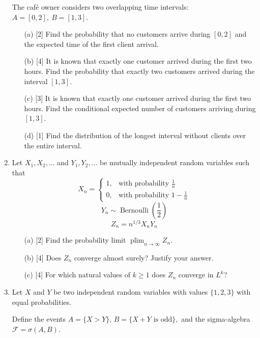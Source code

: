 \begin{enumerate}
The café owner considers two overlapping time intervals:
$
A=[0,2],\ B=[1,3].
$

\begin{enumerate}
    \item[(a)] [2] Find the probability that no customers arrive during \([0,2]\) and the expected time of the first client arrival.

    \item[(b)] [4] It is known that exactly one customer arrived during the first two hours. Find the probability that exactly two customers arrived during the interval \([1,3]\).

    \item[(c)] [3] It is known that exactly one customer arrived during the first two hours. Find the conditional expected number of customers arriving during \([1,3]\).

    \item[(d)] [1] Find the distribution of the longest interval without clients over the entire interval.
\end{enumerate}

\item 
Let $X_1, X_2, \ldots$ and $Y_1, Y_2, \ldots$ be
mutually independent random variables such that
\[
X_n =
\begin{cases}
1, & \text{with probability } \frac{1}{n}\\
0, & \text{with probability } 1-\frac{1}{n}
\end{cases}
\]
\[
Y_n \sim \operatorname{Bernoulli}\left(\frac12\right)
\]
\[
Z_n = n^{1/3} X_n Y_n
\]
\begin{enumerate}
    \item[(a)] [2] Find the probability limit
    $
    \operatorname{plim}_{n\to\infty} Z_n.
    $

    \item[(b)] [4] Does $Z_n$ converge almost surely?
    Justify your answer.

    \item[(c)] [4] For which natural values of $k \geqslant 1$ does
    $Z_n$ converge in $L^k$?
\end{enumerate}

\item
Let $X$ and $Y$ be two independent random
variables with values
$\{1,2,3\}$ with equal probabilities.

Define the events
\(
A=\{X>Y\},
\,
B=\{X+Y \text{ is odd}\},
\)
and the sigma-algebra
\(
\mathcal{F}=\sigma(A,B).
\)


\end{enumerate}
